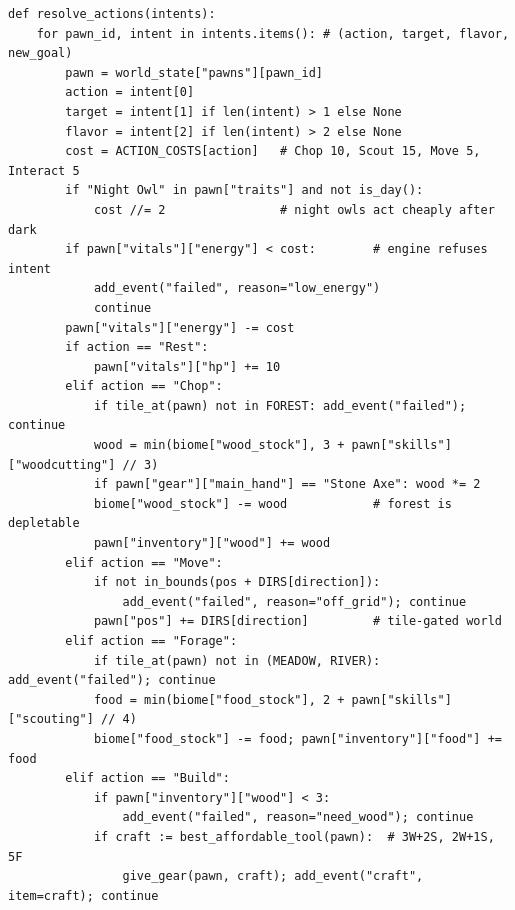 \documentclass[10pt,a4paper]{article}
\begin{document}
\begin{lstlisting}[style=python, caption={Deterministic Resolution (engine.py, condensed). Applies action $\to$ consequences: energy costs, combat, skill XP, relationships, incapacitation, crafting, mental breaks, environmental death, Mate, free-form Interact, personal goals, traits, moodlets, fauna (hunt/tame, granary, palisade), visitors (barter, plunder, recruit), scavenger raids (steal, defend, flee), megaprojects (monument), farm plots (till/grow/harvest), emergent traditions (counters $\to$ Tradition Tag), solstice feasts &amp; funerary rites (Grief halving), wildfires, seasonal disasters, and Stage 9 synthesis (custom recipes, quests, clamped balance modifiers)}, label={lst:engine}]
def resolve_actions(intents):
    for pawn_id, intent in intents.items(): # (action, target, flavor, new_goal)
        pawn = world_state["pawns"][pawn_id]
        action = intent[0]
        target = intent[1] if len(intent) > 1 else None
        flavor = intent[2] if len(intent) > 2 else None
        cost = ACTION_COSTS[action]   # Chop 10, Scout 15, Move 5, Interact 5
        if "Night Owl" in pawn["traits"] and not is_day():
            cost //= 2                # night owls act cheaply after dark
        if pawn["vitals"]["energy"] < cost:        # engine refuses intent
            add_event("failed", reason="low_energy")
            continue
        pawn["vitals"]["energy"] -= cost
        if action == "Rest":
            pawn["vitals"]["hp"] += 10
        elif action == "Chop":
            if tile_at(pawn) not in FOREST: add_event("failed"); continue
            wood = min(biome["wood_stock"], 3 + pawn["skills"]["woodcutting"] // 3)
            if pawn["gear"]["main_hand"] == "Stone Axe": wood *= 2
            biome["wood_stock"] -= wood            # forest is depletable
            pawn["inventory"]["wood"] += wood
        elif action == "Move":
            if not in_bounds(pos + DIRS[direction]):
                add_event("failed", reason="off_grid"); continue
            pawn["pos"] += DIRS[direction]         # tile-gated world
        elif action == "Forage":
            if tile_at(pawn) not in (MEADOW, RIVER): add_event("failed"); continue
            food = min(biome["food_stock"], 2 + pawn["skills"]["scouting"] // 4)
            biome["food_stock"] -= food; pawn["inventory"]["food"] += food
        elif action == "Build":
            if pawn["inventory"]["wood"] < 3:
                add_event("failed", reason="need_wood"); continue
            if craft := best_affordable_tool(pawn):  # 3W+2S, 2W+1S, 5F
                give_gear(pawn, craft); add_event("craft", item=craft); continue

\end{lstlisting}
\end{document}
